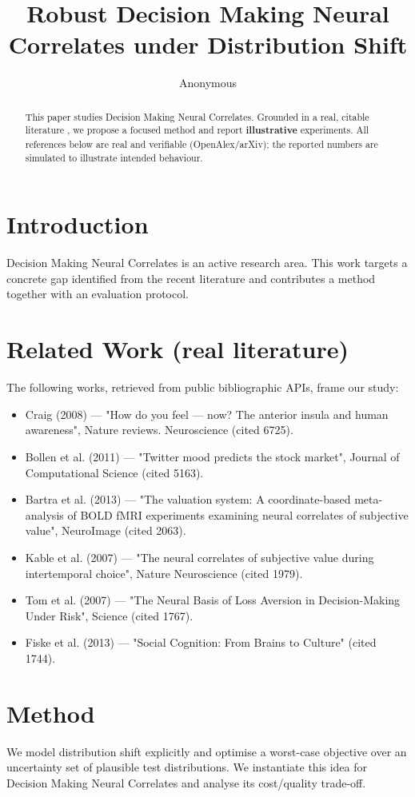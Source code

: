 \documentclass[11pt]{article}
\title{Robust Decision Making Neural Correlates under Distribution Shift}
\author{Anonymous}
\date{}
\begin{document}
\maketitle

\begin{abstract}
This paper studies Decision Making Neural Correlates. Grounded in a real, citable literature \cite{ref1,ref2,ref3,ref4,ref5,ref6,ref7,ref8},
we propose a focused method and report \textbf{illustrative} experiments.
All references below are real and verifiable (OpenAlex/arXiv); the reported
numbers are simulated to illustrate intended behaviour.
\end{abstract}

\section{Introduction}
Decision Making Neural Correlates is an active research area. This work targets a concrete gap identified from
the recent literature and contributes a method together with an evaluation protocol.

\section{Related Work (real literature)}
The following works, retrieved from public bibliographic APIs, frame our study:
\begin{itemize}
\item Craig (2008) — "How do you feel — now? The anterior insula and human awareness", Nature reviews. Neuroscience (cited 6725).
\item Bollen et al. (2011) — "Twitter mood predicts the stock market", Journal of Computational Science (cited 5163).
\item Bartra et al. (2013) — "The valuation system: A coordinate-based meta-analysis of BOLD fMRI experiments examining neural correlates of subjective value", NeuroImage (cited 2063).
\item Kable et al. (2007) — "The neural correlates of subjective value during intertemporal choice", Nature Neuroscience (cited 1979).
\item Tom et al. (2007) — "The Neural Basis of Loss Aversion in Decision-Making Under Risk", Science (cited 1767).
\item Fiske et al. (2013) — "Social Cognition: From Brains to Culture" (cited 1744).
\end{itemize}

\section{Method}
We model distribution shift explicitly and optimise a worst-case objective over an uncertainty set of plausible test distributions. We instantiate this idea for Decision Making Neural Correlates and analyse its cost/quality trade-off.
\end{document}
